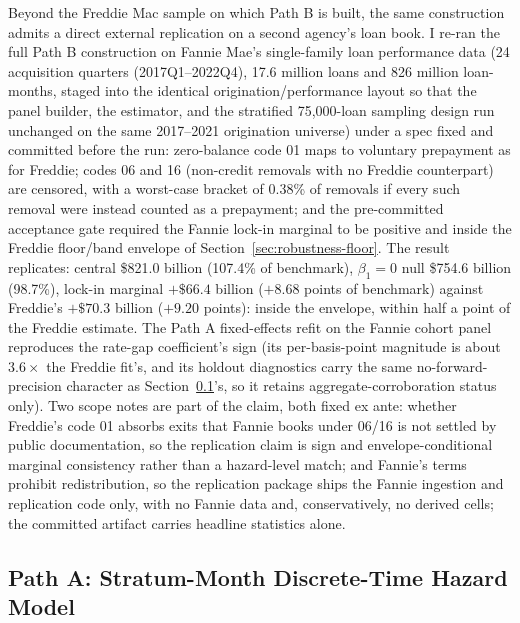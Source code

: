 \documentclass[12pt]{article}
\begin{document}
Beyond the Freddie Mac sample on which Path B is built, the same construction admits a direct external replication on a second agency's loan book. I re-ran the full Path B construction on Fannie Mae's single-family loan performance data (24 acquisition quarters (2017Q1--2022Q4), 17.6 million loans and 826 million loan-months, staged into the identical origination/performance layout so that the panel builder, the estimator, and the stratified 75{,}000-loan sampling design run unchanged on the same 2017--2021 origination universe) under a spec fixed and committed before the run: zero-balance code 01 maps to voluntary prepayment as for Freddie; codes 06 and 16 (non-credit removals with no Freddie counterpart) are censored, with a worst-case bracket of 0.38\% of removals if every such removal were instead counted as a prepayment; and the pre-committed acceptance gate required the Fannie lock-in marginal to be positive and inside the Freddie floor/band envelope of Section~\ref{sec:robustness-floor}. The result replicates: central \$821.0 billion (107.4\% of benchmark), $\beta_1 = 0$ null \$754.6 billion (98.7\%), lock-in marginal $+\$66.4$ billion ($+8.68$ points of benchmark) against Freddie's $+\$70.3$ billion ($+9.20$ points): inside the envelope, within half a point of the Freddie estimate. The Path A fixed-effects refit on the Fannie cohort panel reproduces the rate-gap coefficient's sign (its per-basis-point magnitude is about $3.6\times$ the Freddie fit's, and its holdout diagnostics carry the same no-forward-precision character as Section~\ref{sec:patha}'s, so it retains aggregate-corroboration status only). Two scope notes are part of the claim, both fixed ex ante: whether Freddie's code 01 absorbs exits that Fannie books under 06/16 is not settled by public documentation, so the replication claim is sign and envelope-conditional marginal consistency rather than a hazard-level match; and Fannie's terms prohibit redistribution, so the replication package ships the Fannie ingestion and replication code only, with no Fannie data and, conservatively, no derived cells; the committed artifact carries headline statistics alone.

\subsection{Path A: Stratum-Month Discrete-Time Hazard Model}\label{sec:patha}
\end{document}
